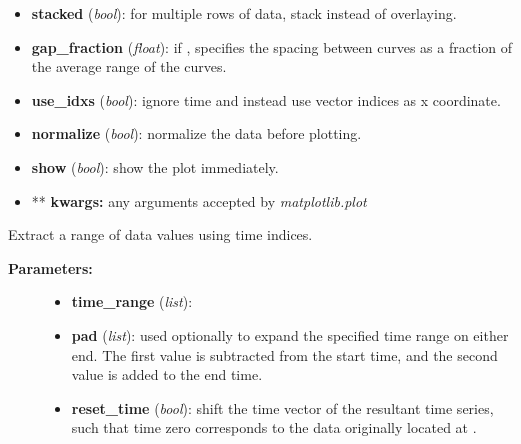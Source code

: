 \documentclass[letterpaper,10pt,english]{sphinxmanual}
\begin{document}
\begin{fulllineitems}
\begin{fulllineitems}
\begin{description}
\begin{itemize}
\item {} 
\textbf{stacked} (\emph{bool}): for multiple rows of data, stack instead of overlaying.

\item {} 
\textbf{gap\_fraction} (\emph{float}): if , specifies the spacing between curves as a fraction of the average range of the curves.

\item {} 
\textbf{use\_idxs} (\emph{bool}): ignore time and instead use vector indices as x coordinate.

\item {} 
\textbf{normalize} (\emph{bool}): normalize the data before plotting.

\item {} 
\textbf{show} (\emph{bool}): show the plot immediately.

\item {} 
** \textbf{kwargs:} any arguments accepted by \emph{matplotlib.plot}

\end{itemize}

\end{description}

\end{fulllineitems}


\begin{fulllineitems}
\label{data_structures:time_series.TimeSeries.take}
Extract a range of data values using time indices.
\begin{description}
\item[{\textbf{Parameters:}}] \leavevmode\begin{itemize}
\item {} 
\textbf{time\_range} (\emph{list}): 

\item {} 
\textbf{pad} (\emph{list}): used optionally to expand the specified time range on either end. The first value is subtracted from the start time, and the second value is added to the end time.

\item {} 
\textbf{reset\_time} (\emph{bool}): shift the time vector of the resultant time series, such that time zero corresponds to the data originally located at .


\end{itemize}
\end{description}
\end{fulllineitems}
\end{fulllineitems}
\end{document}

